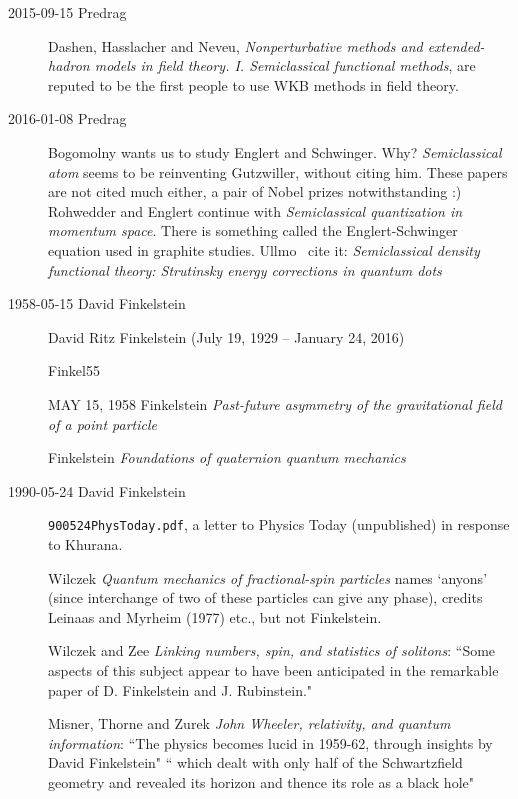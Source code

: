 \begin{description}
\item[2015-09-15 Predrag]
Dashen, Hasslacher and Neveu,
\emph{Nonperturbative methods and extended-hadron models in field theory.
{I}. {Semiclassical} functional methods},
are reputed to be the first people to use WKB methods in field theory.


\item[2016-01-08 Predrag]
Bogomolny wants us to study Englert and
Schwinger. Why?
 {\em Semiclassical atom} seems to be reinventing
Gutzwiller, without citing him. These papers are not cited much either, a
pair of Nobel prizes notwithstanding :) Rohwedder and
Englert continue with {\em Semiclassical quantization in
momentum space}. There is something called the Englert-Schwinger equation
used in graphite studies. Ullmo~\etal{} cite it:
{\em Semiclassical density functional theory: {Strutinsky} energy
corrections in quantum dots}

\item[1958-05-15 David Finkelstein]

David Ritz Finkelstein (July 19, 1929 -- January 24, 2016)

Finkel55

MAY 15, 1958
Finkelstein
{\em Past-future asymmetry of the gravitational field of a point particle}

Finkelstein \etal{}
{\em Foundations of quaternion quantum mechanics}

\item[1990-05-24 David Finkelstein] \texttt{900524PhysToday.pdf}, a
letter to Physics Today (unpublished) in response to Khurana.

Wilczek {\em Quantum mechanics of fractional-spin
particles} names `anyons' (since interchange of two of these particles
can give any phase), credits  Leinaas and Myrheim (1977) etc., but not
Finkelstein.

Wilczek and Zee
{\em Linking numbers, spin, and statistics of solitons}:
``Some aspects of this subject appear to have been anticipated in the
remarkable paper of D. Finkelstein and J. Rubinstein."

Misner, Thorne and Zurek
{\em {John Wheeler}, relativity, and quantum information}:
``The physics becomes lucid in 1959-62, through insights by David Finkelstein"
`` which dealt with only half of the Schwartzfield geometry and revealed its horizon
and thence its role as a black hole"



\end{description}
